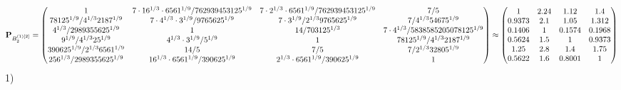 \documentclass[10pt,a4paper]{article}
\begin{document}
	\[
		\bold{P}_{B_2^{(1)[2]}} = 
		\begin{pmatrix}
			{1}{} & {{7} \cdot {16^ {1 / 3}} \cdot {6561^ {1 / 9}}} / {{762939453125^ {1 / 9}}} & {{7} \cdot {2^ {1 / 3}} \cdot {6561^ {1 / 9}}} / {{762939453125^ {1 / 9}}} & {{7}} / {{5}} \\
			{{78125^ {1 / 9}}} / {{4^ {1 / 3}}{2187^ {1 / 9}}} & {{7} \cdot {4^ {1 / 3}} \cdot {3^ {1 / 9}}} / {{9765625^ {1 / 9}}} & {{7} \cdot {3^ {1 / 9}}} / {{2^ {1 / 3}}{9765625^ {1 / 9}}} & {{7}} / {{4^ {1 / 3}}{54675^ {1 / 9}}} \\
			{{4^ {1 / 3}}} / {{2989355625^ {1 / 9}}} & {1}{} & {{14}} / {{703125^ {1 / 3}}} & {{7} \cdot {4^ {1 / 3}}} / {{5838585205078125^ {1 / 9}}} \\
			{{9^ {1 / 9}}} / {{4^ {1 / 3}}{25^ {1 / 9}}} & {{4^ {1 / 3}} \cdot {3^ {1 / 9}}} / {{5^ {1 / 9}}} & {1}{} & {{78125^ {1 / 9}}} / {{4^ {1 / 3}}{2187^ {1 / 9}}} \\
			{{390625^ {1 / 9}}} / {{2^ {1 / 3}}{6561^ {1 / 9}}} & {{14}} / {{5}} & {{7}} / {{5}} & {{7}} / {{2^ {1 / 3}}{32805^ {1 / 9}}} \\
			{{256^ {1 / 3}}} / {{2989355625^ {1 / 9}}} & {{16^ {1 / 3}} \cdot {6561^ {1 / 9}}} / {{390625^ {1 / 9}}} & {{2^ {1 / 3}} \cdot {6561^ {1 / 9}}} / {{390625^ {1 / 9}}} & {1}{} \\
		\end{pmatrix}
		\approx
		\begin{pmatrix}
			1        & 2.24     & 1.12     & 1.4      \\
			0.9373   & 2.1      & 1.05     & 1.312    \\
			0.1406   & 1        & 0.1574   & 0.1968   \\
			0.5624   & 1.5      & 1        & 0.9373   \\
			1.25     & 2.8      & 1.4      & 1.75     \\
			0.5622   & 1.6      & 0.8001   & 1        \\
		\end{pmatrix}
	\]
	1)
\end{document}
